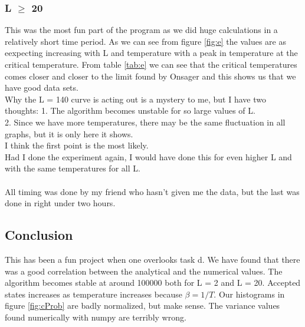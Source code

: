 \documentclass{article}
\begin{document}
\subsubsection*{L $\geq$ 20}
This was the most fun part of the program as we did huge calculations in a relatively short time period. As we can see from figure \ref{fig:e} the values are as eexpecting increasing with L and temperature with a peak in temperature at the critical temperature. From table \ref{tab:e} we can see that the critical temperatures comes closer and closer to the limit found by Onsager and this shows us that we have good data sets. \\
Why the L = 140 curve is acting out is a mystery to me, but I have two thoughts:
1. The algorithm becomes unstable for so large values of L. \\
2. Since we have more temperatures, there may be the same fluctuation in all graphs, but it is only here it shows. \\
I think the first point is the most likely. \\
Had I done the experiment again, I would have done this for even higher L and with the same temperatures for all L.
\\ \\
All timing was done by my friend who hasn't given me the data, but the last was done in right under two hours.
\subsection*{Conclusion}
This has been a fun project when one overlooks task d. We have found that there was a good correlation between the analytical and the numerical values. The algorithm becomes stable at around 100000 both for L = 2 and L = 20. Accepted states increases as temperature increases because $\beta = 1/T$. Our histograms in figure \ref{fig:cProb} are badly normalized, but make sense. The variance values found numerically with numpy are terribly wrong. \\


\end{document}
